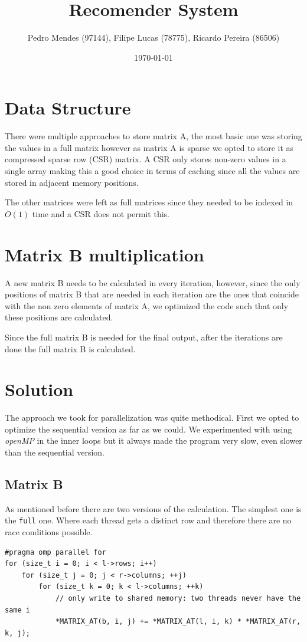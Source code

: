 \documentclass[a4paper]{article}
\begin{document}
\title{Recomender System}
\author{Pedro Mendes (97144), Filipe Lucas (78775), Ricardo Pereira (86506)}
\date{\today}
\maketitle

\section{Data Structure}
There were multiple approaches to store matrix A, the most basic one was
storing the values in a full matrix however as matrix A is sparse
we opted to store it as compressed sparse row (CSR) matrix. A CSR only stores
non-zero values in a single array making this a good choice in terms of
caching since all the values are stored in adjacent memory positions.

The other matrices were left as full matrices since they needed to be indexed in
$O(1)$ time and a CSR does not permit this.

\section{Matrix B multiplication}
A new matrix B needs to be calculated in every iteration, however, since the only
positions of matrix B that are needed in each iteration are the ones that
coincide with the non zero elements of matrix A, we optimized the code such that
only these positions are calculated.

Since the full matrix B is needed for the final output, after the iterations are
done the full matrix B is calculated.

\section{Solution}

The approach we took for parallelization was quite methodical. First we opted to
optimize the sequential version as far as we could. We experimented with using
\textit{openMP} in the inner loops but it always made the program very slow, even slower
than the sequential version.

\subsection{Matrix B}

As mentioned before there are two versions of the calculation. The simplest one
is the \texttt{full} one. Where each thread gets a distinct row and therefore
there are no race conditions possible.
\begin{verbatim}
#pragma omp parallel for
for (size_t i = 0; i < l->rows; i++)
    for (size_t j = 0; j < r->columns; ++j)
        for (size_t k = 0; k < l->columns; ++k)
            // only write to shared memory: two threads never have the same i
            *MATRIX_AT(b, i, j) += *MATRIX_AT(l, i, k) * *MATRIX_AT(r, k, j);
\end{verbatim}
\end{document}
